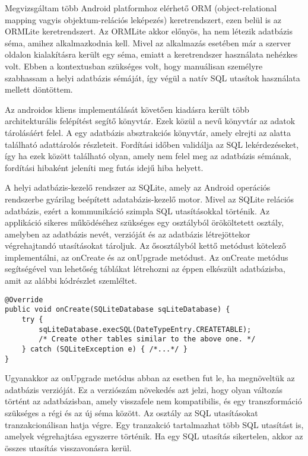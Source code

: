 Megvizsgáltam több Android platformhoz elérhető ORM (object-relational mapping vagyis objektum-relációs leképezés) keretrendszert, ezen belül is az ORMLite keretrendszert. 
Az ORMLite akkor előnyös, ha nem létezik adatbázis séma, amihez alkalmazkodnia kell.
Mivel az alkalmazás esetében már a szerver oldalon kialakításra került egy séma, emiatt a keretrendszer használata nehézkes volt.
Ebben a kontextusban szükséges volt, hogy manuálisan személyre szabhassam a helyi adatbázis sémáját, így végül a natív SQL utasítok használata mellett döntöttem.

Az androidos kliens implementálását követően kiadásra került több architekturális felépítést segítő könyvtár.
Ezek közül a  nevű könyvtár az adatok tárolásáért felel.
A  egy adatbázis absztrakciós könyvtár, amely elrejti az alatta található adattárolós részleteit.
Fordítási időben validálja az SQL lekérdezéseket, így ha ezek között található olyan, amely nem felel meg az adatbázis sémának, fordítási hibaként jeleníti meg futás idejű hiba helyett.

A helyi adatbázis-kezelő rendszer az SQLite, amely az Android operációs rendszerbe gyárilag beépített adatabázis-kezelő motor.
Mivel az SQLite relációs adatbázis, ezért a kommunikáció szimpla SQL utasításokkal történik.
Az applikáció sikeres működéséhez szükséges egy  osztályból örököltetett osztály, amelyben az adatbázis nevét, verzióját és az adatbázis létrejöttekor végrehajtandó utasításokat tároljuk.
Az ősosztályból kettő metódust kötelező implementálni, az onCreate és az onUpgrade metódust.
Az onCreate metódus segítségével van lehetőség táblákat létrehozni az éppen elkészült adatbázisba, amit az alábbi kódrészlet szemléltet.
\begin{lstlisting}
@Override
public void onCreate(SQLiteDatabase sqLiteDatabase) {
	try {
		sqLiteDatabase.execSQL(DateTypeEntry.CREATETABLE);
		/* Create other tables similar to the above one. */
	} catch (SQLiteException e) { /*...*/ }
}
\end{lstlisting}
Ugyanakkor az onUpgrade metódus abban az esetben fut le, ha megnöveltük az adatbázis verzióját.
Ez a verziószám növekedés azt jelzi, hogy olyan változás történt az adatbázisban, amely visszafele nem kompatibilis, és egy transzformáció szükséges a régi és az új séma között.
Az  osztály az SQL utasításokat tranzakcionálisan hatja végre.
Egy tranzakció tartalmazhat több SQL utasítást is, amelyek végrehajtása egyszerre történik.
Ha egy SQL utasítás sikertelen, akkor az összes utasítás visszavonásra kerül.


